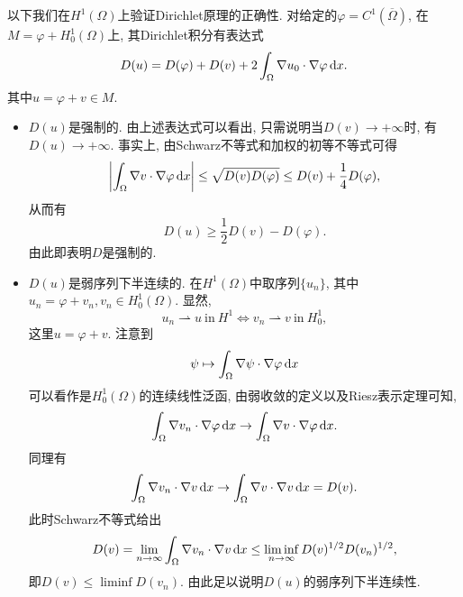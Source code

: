 \documentclass[12pt,a4paper]{article}
\begin{document}
以下我们在$H^1(\Omega)$上验证Dirichlet原理的正确性.
对给定的$\varphi = C^1(\overline{\Omega})$, 在$M = \varphi + H_0^1(\Omega)$上, 其Dirichlet积分有表达式 
\begin{equation*}
    D(u) = D(\varphi) + D(v) + 2\int_{\Omega}\nabla u_0 \cdot \nabla \varphi \,{\rm d}x.
\end{equation*}
其中$u = \varphi + v \in M$.
\begin{itemize}
    \item $D(u)$是强制的. 由上述表达式可以看出, 只需说明当$D(v) \rightarrow +\infty$时, 有$D(u) \rightarrow +\infty$.
    事实上, 由Schwarz不等式和加权的初等不等式可得 
    \begin{equation*}
        \left|\int_{\Omega}\nabla v \cdot \nabla \varphi \,{\rm d}x\right| \leq \sqrt{D(v)D(\varphi)} \leq D(v) + \frac{1}{4}D(\varphi),
    \end{equation*}
    从而有 
    \begin{equation*}
        D(u) \geq \frac{1}{2}D(v) - D(\varphi).
    \end{equation*}
    由此即表明$D$是强制的.
    \item $D(u)$是弱序列下半连续的. 在$H^1(\Omega)$中取序列$\{u_n\}$, 其中$u_n = \varphi + v_n, v_n \in H_0^1(\Omega)$. 
    显然, 
    \begin{equation*}
        u_n \rightharpoonup u \ \text{in}\ H^1 \Leftrightarrow v_n \rightharpoonup v \ \text{in}\ H_0^1,
    \end{equation*}
    这里$u = \varphi + v$. 注意到
    \begin{equation*}
        \psi \mapsto \int_{\Omega}\nabla \psi \cdot \nabla \varphi \,{\rm d}x
    \end{equation*}
    可以看作是$H_0^1(\Omega)$的连续线性泛函, 由弱收敛的定义以及Riesz表示定理可知, 
    \begin{equation*}
        \int_{\Omega}\nabla v_n \cdot \nabla \varphi \,{\rm d}x \rightarrow \int_{\Omega}\nabla v \cdot \nabla \varphi \,{\rm d}x.
    \end{equation*}
    同理有 
    \begin{equation*}
        \int_{\Omega}\nabla v_n \cdot \nabla v \,{\rm d}x \rightarrow \int_{\Omega}\nabla v \cdot \nabla v \,{\rm d}x = D(v).
    \end{equation*}
    此时Schwarz不等式给出 
    \begin{equation*}
        D(v) = \lim\limits_{n \rightarrow \infty}\int_{\Omega}\nabla v_n \cdot \nabla v \,{\rm d}x \leq \liminf\limits_{n \rightarrow \infty}D(v)^{1/2}D(v_n)^{1/2}, 
    \end{equation*}
    即$D(v) \leq \liminf D(v_n)$. 由此足以说明$D(u)$的弱序列下半连续性.
\end{itemize}
\end{document}
